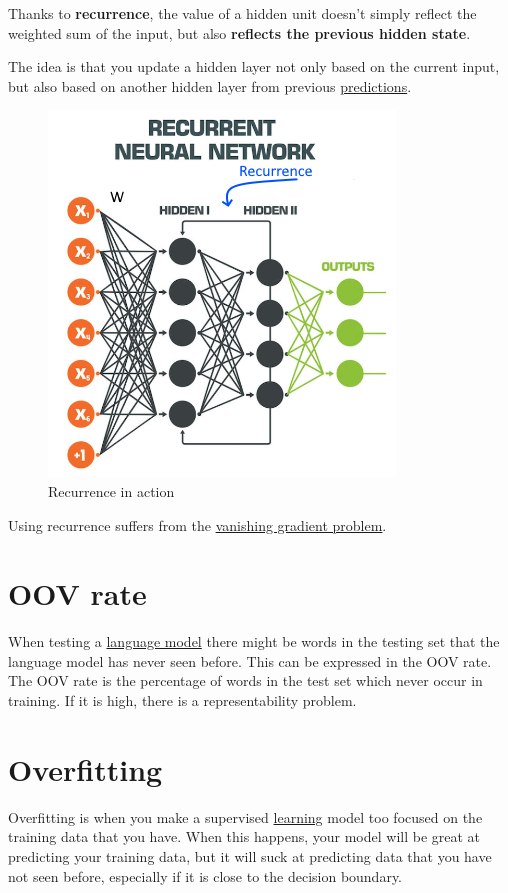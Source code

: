 \documentclass[
  11pt,
  british,
]{article}
\begin{document}
Thanks to \textbf{recurrence}, the value of a hidden unit doesn't simply
reflect the weighted sum of the input, but also \textbf{reflects the
previous hidden state}.

The idea is that you update a hidden layer not only based on the current
input, but also based on another hidden layer from previous
\href{Prediction.md}{predictions}.

\begin{figure}
\centering
\includegraphics{RNN2.png}
\caption{Recurrence in action}
\end{figure}

Using recurrence suffers from the
\href{../Vanishing\%20gradient\%20problem.md}{vanishing gradient
problem}.

\hypertarget{oov-rate}{%
\section{OOV rate}\label{oov-rate}}

When testing a \href{Language\%20Modeling.md}{language model} there
might be words in the testing set that the language model has never seen
before. This can be expressed in the OOV rate. The OOV rate is the
percentage of words in the test set which never occur in training. If it
is high, there is a representability problem.

\hypertarget{overfitting}{%
\section{Overfitting}\label{overfitting}}

Overfitting is when you make a supervised
\href{../Other/Learning.md}{learning} model too focused on the training
data that you have. When this happens, your model will be great at
predicting your training data, but it will suck at predicting data that
you have not seen before, especially if it is close to the decision
boundary.
\end{document}
